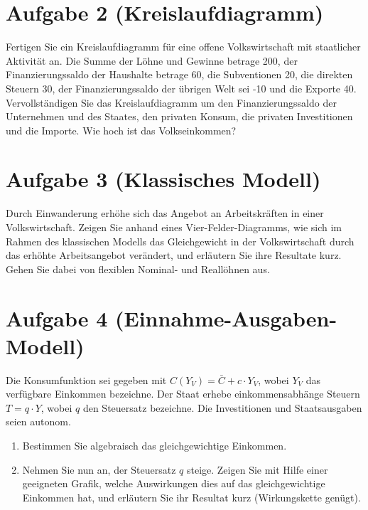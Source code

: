 \documentclass{scrartcl}
\begin{document}
\section*{Aufgabe 2 (Kreislaufdiagramm)}
Fertigen Sie ein Kreislaufdiagramm f\"{u}r eine offene Volkswirtschaft mit staatlicher Aktivit\"{a}t an. Die Summe der L\"{o}hne und Gewinne betrage 200, der Finanzierungssaldo der Haushalte betrage 60, die Subventionen 20, die direkten Steuern 30, der Finanzierungssaldo der \"{u}brigen Welt sei -10 und die Exporte 40. Vervollst\"{a}ndigen Sie das Kreislaufdiagramm um den Finanzierungssaldo der Unternehmen und des Staates, den privaten Konsum, die privaten Investitionen und die Importe. Wie hoch ist das Volkseinkommen?

\section*{Aufgabe 3 (Klassisches Modell)}
Durch Einwanderung erh\"{o}he sich das Angebot an Arbeitskr\"{a}ften in einer Volkswirtschaft. Zeigen Sie anhand eines Vier-Felder-Diagramms, wie sich im Rahmen des klassischen Modells das Gleichgewicht in der Volkswirtschaft durch das erh\"{o}hte Arbeitsangebot ver\"{a}ndert, und erl\"{a}utern Sie ihre Resultate kurz. Gehen Sie dabei von flexiblen Nominal- und Reall\"{o}hnen aus.

\section*{Aufgabe 4 (Einnahme-Ausgaben-Modell)}
Die Konsumfunktion sei gegeben mit $C(Y_V) = \bar{C} + c \cdot Y_{V}$, wobei $Y_V$ das verf\"{u}gbare Einkommen bezeichne. Der Staat erhebe einkommensabh\"{a}nge Steuern $T=q\cdot Y$, wobei $q$ den Steuersatz bezeichne. Die Investitionen und Staatsausgaben seien autonom.
\begin{enumerate}
	\item Bestimmen Sie algebraisch das gleichgewichtige Einkommen.
	\item Nehmen Sie nun an, der Steuersatz $q$ steige. Zeigen Sie mit Hilfe einer geeigneten Grafik, welche Auswirkungen dies auf das gleichgewichtige Einkommen hat, und erl\"{a}utern Sie ihr Resultat kurz (Wirkungskette gen\"{u}gt).
\end{enumerate}
\newpage
\end{document}
